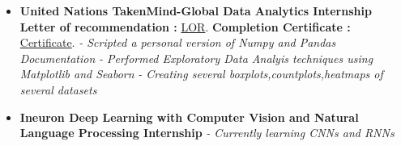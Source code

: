 \documentclass[a4paper,12pt]{article}
\begin{document}
\begin{itemize}
    \item{\textbf{\large{United Nations TakenMind-Global Data Analytics Internship}}
    \newline
    \textbf{Letter of recommendation :} \href{https://github.com/teetangh/Kaustav-All-Certifications/blob/master/Artificial%20Intelligence/UN%20Takenmind%20Data%20Analytics%20Internship/35799-KaustavGhosh-recommendation-letter.pdf}{LOR}.
    \textbf{Completion Certificate :} \href{https://github.com/teetangh/Kaustav-All-Certifications/blob/master/Artificial%20Intelligence/UN%20Takenmind%20Data%20Analytics%20Internship/35799-KaustavGhosh.pdf}{Certificate}.
    \newline
    \textit{- Scripted a personal version of Numpy and Pandas Documentation }
    \newline
    \textit{- Performed Exploratory Data Analyis techniques using Matplotlib and Seaborn }
    \newline
    \textit{- Creating several boxplots,countplots,heatmaps of several datasets}}
\end{itemize}
\begin{itemize}
    \item{\textbf{\large{Ineuron Deep Learning with Computer Vision and Natural Language Processing Internship}}
    \newline
    \textit{- Currently learning CNNs and RNNs }}
\end{itemize}



\pagebreak
\end{document}
